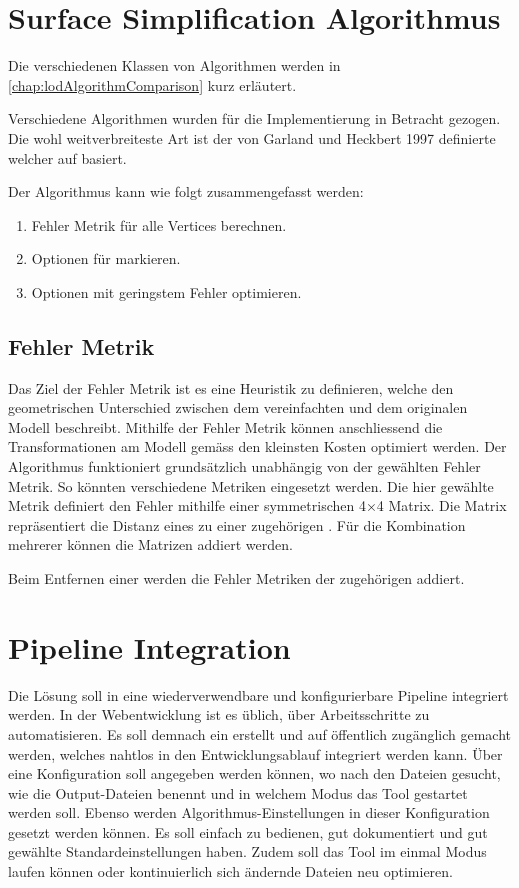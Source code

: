 \section{Surface Simplification Algorithmus}
Die verschiedenen Klassen von Algorithmen werden in \autoref{chap:lodAlgorithmComparison} kurz erläutert.

Verschiedene Algorithmen wurden für die Implementierung in Betracht gezogen. Die wohl weitverbreiteste Art ist der von Garland und Heckbert 1997 definierte  welcher auf  basiert.
\cite{surfaceSimplificationUsingQuadricErrorMetrices}

Der Algorithmus kann wie folgt zusammengefasst werden:

\begin{enumerate}
  \item Fehler Metrik für alle Vertices berechnen.
  \item Optionen für  markieren.
  \item Optionen mit geringstem Fehler optimieren.
\end{enumerate}

\subsection{Fehler Metrik}
Das Ziel der Fehler Metrik ist es eine Heuristik zu definieren, welche den geometrischen Unterschied zwischen dem vereinfachten und dem originalen Modell beschreibt.
Mithilfe der Fehler Metrik können anschliessend die Transformationen am Modell gemäss den kleinsten Kosten optimiert werden. Der Algorithmus funktioniert grundsätzlich unabhängig von der gewählten Fehler Metrik. So könnten verschiedene Metriken eingesetzt werden.
Die hier gewählte Metrik definiert den Fehler mithilfe einer symmetrischen 4×4 Matrix. Die Matrix repräsentiert die Distanz eines  zu einer zugehörigen . Für die Kombination mehrerer  können die Matrizen addiert werden.

Beim Entfernen einer  werden die Fehler Metriken der zugehörigen  addiert.

\section{Pipeline Integration}
Die Lösung soll in eine wiederverwendbare und konfigurierbare Pipeline integriert werden.
In der Webentwicklung ist es üblich, über  Arbeitsschritte zu automatisieren. Es soll demnach ein  erstellt und auf  öffentlich zugänglich gemacht werden, welches nahtlos in den Entwicklungsablauf integriert werden kann. Über eine Konfiguration soll angegeben werden können, wo nach den  Dateien gesucht, wie die Output-Dateien benennt und in welchem Modus das Tool gestartet werden soll. Ebenso werden Algorithmus-Einstellungen in dieser Konfiguration gesetzt werden können. Es soll einfach zu bedienen, gut dokumentiert und gut gewählte Standardeinstellungen haben. Zudem soll das Tool im einmal Modus laufen können oder kontinuierlich sich ändernde Dateien neu optimieren.


